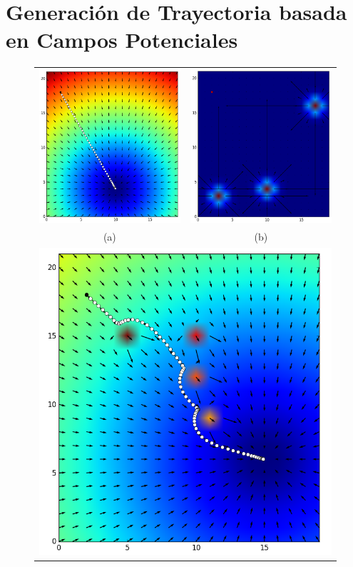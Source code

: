 \section{Generación de Trayectoria basada en Campos Potenciales}
\label{sec:autonomia}

\begin{figure}%
  \centering
  \begin{tabular}{cc}
     \includegraphics[width=0.45\linewidth]{images/attr_force.png}&
     \includegraphics[width=0.45\linewidth]{images/rep_force.png}\\
    (a) & (b)\\
    \multicolumn{2}{c}{\includegraphics[width=0.50\linewidth]{images/nav_force.png}}\\

\end{tabular}
\end{figure}
